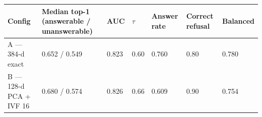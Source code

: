 \begin{tabular}{lllllll}
\hline
Config & Median top-1 (answerable / unanswerable) & AUC & $\tau$ & Answer rate & Correct refusal & Balanced \\
\hline
A --- 384-d exact & 0.652 / 0.549 & 0.823 & 0.60 & 0.760 & 0.80 & 0.780 \\
B --- 128-d PCA + IVF 16 & 0.680 / 0.574 & 0.826 & 0.66 & 0.609 & 0.90 & 0.754 \\
\hline
\end{tabular}
